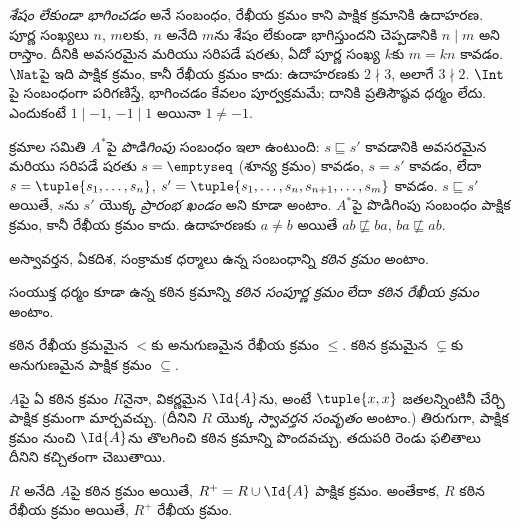 \documentclass[../../../include/open-logic-section]{subfiles}
\begin{document}
\begin{ex}
\emph{శేషం లేకుండా భాగించడం} అనే సంబంధం, రేఖీయ క్రమం కాని
పాక్షిక క్రమానికి ఉదాహరణ. పూర్ణ సంఖ్యలు $n$, $m$లకు,
$n$ అనేది $m$ను శేషం లేకుండా భాగిస్తుందని చెప్పడానికి $n \mid m$
అని రాస్తాం. దీనికి అవసరమైన మరియు సరిపడే షరతు, ఏదో పూర్ణ సంఖ్య $k$కు $m = kn$ కావడం.
$\Nat$పై ఇది పాక్షిక క్రమం, కానీ రేఖీయ క్రమం కాదు:
ఉదాహరణకు $2 \nmid 3$, అలాగే $3 \nmid 2$.
$\Int$పై సంబంధంగా పరిగణిస్తే, భాగించడం కేవలం పూర్వక్రమమే;
దానికి ప్రతిసౌష్ఠవ ధర్మం లేదు. ఎందుకంటే $1 \mid -1$,
$-1 \mid 1$ అయినా $1 \neq -1$.
\end{ex}

\begin{ex}
క్రమాల సమితి $A^*$పై \emph{పొడిగింపు} సంబంధం ఇలా ఉంటుంది:
$s \sqsubseteq s'$ కావడానికి అవసరమైన మరియు సరిపడే షరతు
$s = \emptyseq$ (శూన్య క్రమం) కావడం, $s = s'$ కావడం, లేదా
$s = \tuple{s_1, \dots, s_n}$,
$s' = \tuple{s_1, \dots, s_n, s_{n+1}, \dots, s_m}$ కావడం.
$s \sqsubseteq s'$ అయితే, $s$ను $s'$ యొక్క \emph{ప్రారంభ ఖండం}
అని కూడా అంటాం. $A^*$పై పొడిగింపు సంబంధం పాక్షిక క్రమం,
కానీ రేఖీయ క్రమం కాదు. ఉదాహరణకు $a \neq b$ అయితే
$ab \not\sqsubseteq ba$, $ba \not\sqsubseteq ab$.
\end{ex}

\begin{defn}[కఠిన క్రమం]
అస్వావర్తన, ఏకదిశ, సంక్రామక ధర్మాలు ఉన్న సంబంధాన్ని
\emph{కఠిన క్రమం} అంటాం.
\end{defn}

\begin{defn}[కఠిన రేఖీయ క్రమం]
సంయుక్త ధర్మం కూడా ఉన్న కఠిన క్రమాన్ని
\emph{కఠిన సంపూర్ణ క్రమం} లేదా \emph{కఠిన రేఖీయ క్రమం} అంటాం.
\end{defn}

\begin{ex}
కఠిన రేఖీయ క్రమమైన $<$కు అనుగుణమైన రేఖీయ క్రమం $\le$.
కఠిన క్రమమైన $\subsetneq$కు అనుగుణమైన పాక్షిక క్రమం $\subseteq$.
\end{ex}

$A$పై ఏ కఠిన క్రమం $R$నైనా, వికర్ణమైన $\Id{A}$ను,
అంటే $\tuple{x, x}$ జతలన్నింటినీ చేర్చి పాక్షిక క్రమంగా మార్చవచ్చు.
(దీనిని $R$ యొక్క \emph{స్వావర్తన సంవృతం} అంటాం.)
తిరుగుగా, పాక్షిక క్రమం నుంచి $\Id{A}$ను తొలగించి కఠిన క్రమాన్ని
పొందవచ్చు. తదుపరి రెండు ఫలితాలు దీనిని కచ్చితంగా చెబుతాయి.

\begin{prop}
$R$ అనేది $A$పై కఠిన క్రమం అయితే, $R^+ = R \cup \Id{A}$
పాక్షిక క్రమం. అంతేకాక, $R$ కఠిన రేఖీయ క్రమం అయితే,
$R^+$ రేఖీయ క్రమం.
\end{prop}
\end{document}
